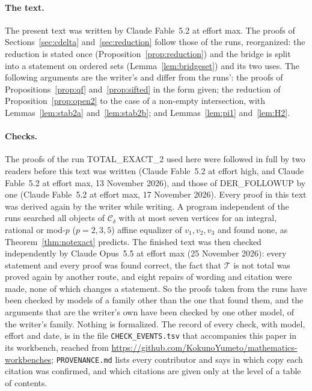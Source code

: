 \documentclass[11pt,a4paper]{article}
\theoremstyle{definition}
\newcommand{\Cd}{\mathcal{C}_{\delta}}
\begin{document}
\paragraph{The text.} The present text was written by Claude Fable~5.2 at
effort max. The proofs of Sections~\ref{sec:cdelta} and~\ref{sec:reduction}
follow those of the runs, reorganized: the reduction is stated once
(Proposition~\ref{prop:reduction}) and the bridge is split into a statement
on ordered sets (Lemma~\ref{lem:bridgeset}) and its two uses. The following
arguments are the writer's and differ from the runs': the proofs of
Propositions~\ref{prop:qf} and~\ref{prop:sifted} in the form given; the
reduction of Proposition~\ref{prop:open2} to the case of a non-empty
intersection, with Lemmas~\ref{lem:stab2a} and~\ref{lem:stab2b}; and
Lemmas~\ref{lem:pi1} and~\ref{lem:H2}.

\paragraph{Checks.} The proofs of the run TOTAL\_EXACT\_2 used here were
followed in full by two readers before this text was written (Claude
Fable~5.2 at effort high, and Claude Fable~5.2 at effort max, 13 November
2026), and those of DER\_FOLLOWUP by one (Claude Fable~5.2 at effort max, 17
November 2026). Every proof in this text was derived again by the writer
while writing. A program independent of the runs searched all objects of
$\Cd$ with at most seven vertices for an integral, rational or mod-$p$
($p=2,3,5$) affine equalizer of $v_1,v_2,v_3$ and found none, as
Theorem~\ref{thm:notexact} predicts. The finished text was then checked
independently by Claude Opus~5.5 at effort max (25 November 2026): every
statement and every proof was found correct, the fact that $\mathcal T$ is not
total was proved again by another route, and eight repairs of wording and
citation were made, none of which changes a statement. So the proofs taken
from the runs have been checked by models of a family other than the one
that found them, and the arguments that are the writer's own have been
checked by one other model, of the writer's family. Nothing is formalized.
The record of every check, with model, effort and date, is in the file
\texttt{CHECK\_EVENTS.tsv} that accompanies this paper in its workbench, reached
from \url{https://github.com/KokunoYumeto/mathematics-workbenches};
\texttt{PROVENANCE.md} lists every contributor and says in which copy each
citation was confirmed, and which citations are given only at the level of
a table of contents.
\end{document}
